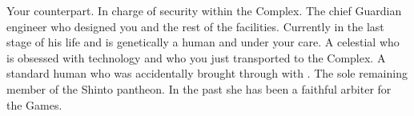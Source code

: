 \documentclass[char]{guardians}
\begin{document}
\begin{contacts}
  \contact{\cWarden{}} Your counterpart. In charge of security within the Complex.
  \contact{\cJascha{}} The chief Guardian engineer who designed you and the rest of the facilities. Currently in the last stage of his life and is genetically a human and under your care.
  \contact{\cUnity{}} A celestial who is obsessed with technology and who you just transported to the Complex.
  \contact{\cKachiko{}} A standard human who was accidentally brought through with \cUnity{}.
  \contact{\cAmaterasu{}} The sole remaining member of the Shinto pantheon. In the past she has been a faithful arbiter for the Games.
\end{contacts}
\end{document}
